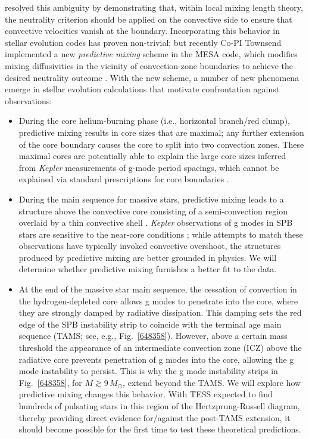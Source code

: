 \citet{Gabriel:2014} resolved this ambiguity by demonstrating that, within local mixing length theory, the neutrality criterion should be applied on the convective side to ensure that convective velocities vanish at the boundary. Incorporating this behavior in stellar evolution codes has proven non-trivial; but recently Co-PI Townsend implemented a new \emph{predictive mixing} scheme in the MESA code, which modifies mixing diffusivities in the vicinity of convection-zone boundaries to achieve the desired neutrality outcome \citep[see][]{Paxton:2017}. With the new scheme, a number of new phenomena emerge in stellar evolution calculations that motivate confrontation against observations:
\begin{itemize}
\item During the core helium-burning phase (i.e., horizontal branch/red clump), predictive mixing results in core sizes that are maximal; any further extension of the core boundary causes the core to split into two convection zones. These maximal cores are potentially able to explain the large core sizes inferred from \emph{Kepler} measurements of g-mode period spacings, which cannot be explained via standard prescriptions for core boundaries \citep[e.g.,][and reference therein]{Constantino:2015}.

\item During the main sequence for massive stars, predictive mixing leads to a structure above the convective core consisting of a semi-convection region overlaid by a thin convective shell \citep[see, e.g., the right-hand panel in Fig.~4 of][]{Paxton:2017}. \emph{Kepler} observations of g modes in SPB stars are sensitive to the near-core conditions \citep[e.g.,][]{Moravveji:2015}; while attempts to match these observations have typically invoked convective overshoot, the structures produced by predictive mixing are better grounded in physics. We will determine whether predictive mixing furnishes a better fit to the data.

\item At the end of the massive star main sequence, the cessation of convection in the hydrogen-depleted core allows g modes to penetrate into the core, where they are strongly damped by radiative dissipation. This damping sets the red edge of the SPB instability strip to coincide with the terminal age main sequence (TAMS; see, e.g., Fig.~\ref{648358}). However, above a certain mass threshold the appearance of an intermediate convection zone (ICZ) above the radiative core prevents penetration of g modes into the core, allowing the g mode instability to persist. This is why the g mode instability strips in Fig.~\ref{648358}, for $M \! \gtrsim \! 9\,M_{\odot}$, extend beyond the TAMS. We will explore how predictive mixing changes this behavior. With TESS expected to find hundreds of pulsating stars in this region of the Hertzprung-Russell diagram, thereby providing direct evidence for/against the post-TAMS extension, it should become possible for the first time to test these theoretical predictions.
\end{itemize}